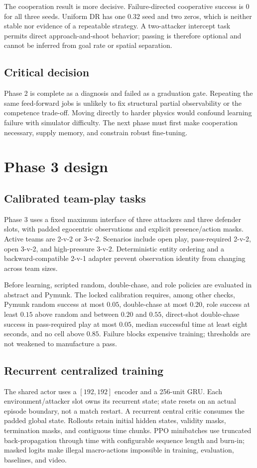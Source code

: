 \documentclass[12pt,twocolumn]{article}
\begin{document}
The cooperation result is more decisive. Failure-directed cooperative success is $0$ for all
three seeds. Uniform DR has one $0.32$ seed and two zeros, which is neither stable nor evidence of
a repeatable strategy. A two-attacker intercept task permits direct approach-and-shoot behavior;
passing is therefore optional and cannot be inferred from goal rate or spatial separation.

\subsection{Critical decision}
Phase 2 is complete as a diagnosis and failed as a graduation gate. Repeating the same feed-forward
jobs is unlikely to fix structural partial observability or the competence trade-off. Moving
directly to harder physics would confound learning failure with simulator difficulty. The next
phase must first make cooperation necessary, supply memory, and constrain robust fine-tuning.

\section{Phase 3 design}
\subsection{Calibrated team-play tasks}
Phase 3 uses a fixed maximum interface of three attackers and three defender slots, with padded
egocentric observations and explicit presence/action masks. Active teams are 2-v-2 or 3-v-2.
Scenarios include open play, pass-required 2-v-2, open 3-v-2, and high-pressure 3-v-2. Deterministic
entity ordering and a backward-compatible 2-v-1 adapter prevent observation identity from changing
across team sizes.

Before learning, scripted random, double-chase, and role policies are evaluated in abstract and
Pymunk. The locked calibration requires, among other checks, Pymunk random success at most $0.05$,
double-chase at most $0.20$, role success at least $0.15$ above random and between $0.20$ and
$0.55$, direct-shot double-chase success in pass-required play at most $0.05$, median successful
time at least eight seconds, and no cell above $0.85$. Failure blocks expensive training; thresholds
are not weakened to manufacture a pass.

\subsection{Recurrent centralized training}
The shared actor uses a $[192,192]$ encoder and a 256-unit GRU. Each environment/attacker slot owns
its recurrent state; state resets on an actual episode boundary, not a match restart. A recurrent
central critic consumes the padded global state. Rollouts retain initial hidden states, validity
masks, termination masks, and contiguous time chunks. PPO minibatches use truncated
back-propagation through time with configurable sequence length and burn-in; masked logits make
illegal macro-actions impossible in training, evaluation, baselines, and video.
\end{document}

